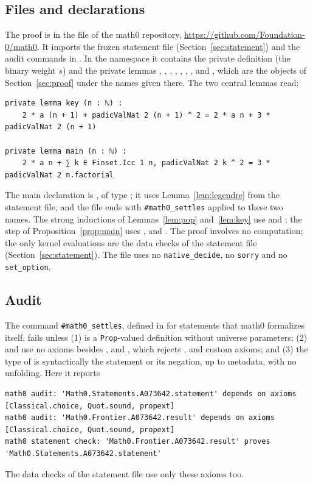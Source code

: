\documentclass[11pt]{amsart}
\theoremstyle{plain}
\theoremstyle{definition}
\begin{document}
\subsection*{Files and declarations}
The proof is in the file  of the math0 repository, \url{https://github.com/Foundation-0/math0}. It imports the frozen statement file  (Section~\ref{sec:statement}) and the audit commands in . In the namespace  it contains the private definition  (the binary weight $s$) and the private lemmas , , , , , , ,  and , which are the objects of Section~\ref{sec:proof} under the names given there. The two central lemmas read:
\begin{lstlisting}
private lemma key (n : ℕ) :
    2 * a (n + 1) + padicValNat 2 (n + 1) ^ 2 = 2 * a n + 3 * padicValNat 2 (n + 1)

private lemma main (n : ℕ) :
    2 * a n + ∑ k ∈ Finset.Icc 1 n, padicValNat 2 k ^ 2 = 3 * padicValNat 2 n.factorial
\end{lstlisting}
The main declaration is , of type ; it uses Lemma~\ref{lem:legendre} from the statement file, and the file ends with \texttt{\#math0\_settles} applied to these two names. The strong inductions of Lemmas~\ref{lem:pop} and~\ref{lem:key} use  and ; the step of Proposition~\ref{prop:main} uses ,  and . The proof involves no computation; the only kernel evaluations are the data checks of the statement file (Section~\ref{sec:statement}). The file uses no \texttt{native\_decide}, no \texttt{sorry} and no \texttt{set\_option}.

\subsection*{Audit}
The command \texttt{\#math0\_settles}, defined in  for statements that math0 formalizes itself, fails unless (1)  is a \texttt{Prop}-valued definition without universe parameters; (2)  and  use no axioms besides ,  and , which rejects ,  and custom axioms; and (3) the type of  is syntactically the statement or its negation, up to metadata, with no unfolding. Here it reports
\begin{lstlisting}[basicstyle=\ttfamily\scriptsize]
math0 audit: 'Math0.Statements.A073642.statement' depends on axioms [Classical.choice, Quot.sound, propext]
math0 audit: 'Math0.Frontier.A073642.result' depends on axioms [Classical.choice, Quot.sound, propext]
math0 statement check: 'Math0.Frontier.A073642.result' proves 'Math0.Statements.A073642.statement'
\end{lstlisting}
The data checks of the statement file use only these axioms too.
\end{document}
